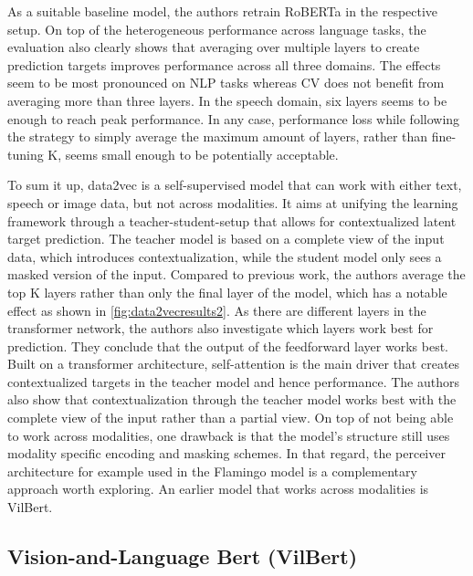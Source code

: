 \documentclass[
]{krantz}
\begin{document}
As a suitable baseline model, the authors retrain RoBERTa in the respective setup. On top of the heterogeneous performance across language tasks, the evaluation also clearly shows that averaging over multiple layers to create prediction targets improves performance across all three domains. The effects seem to be most pronounced on NLP tasks whereas CV does not benefit from averaging more than three layers. In the speech domain, six layers seems to be enough to reach peak performance. In any case, performance loss while following the strategy to simply average the maximum amount of layers, rather than fine-tuning K, seems small enough to be potentially acceptable.

To sum it up, data2vec is a self-supervised model that can work with either text, speech or image data, but not across modalities. It aims at unifying the learning framework through a teacher-student-setup that allows for contextualized latent target prediction. The teacher model is based on a complete view of the input data, which introduces contextualization, while the student model only sees a masked version of the input. Compared to previous work, the authors average the top K layers rather than only the final layer of the model, which has a notable effect as shown in \ref{fig:data2vecresults2}. As there are different layers in the transformer network, the authors also investigate which layers work best for prediction. They conclude that the output of the feedforward layer works best. Built on a transformer architecture, self-attention is the main driver that creates contextualized targets in the teacher model and hence performance. The authors also show that contextualization through the teacher model works best with the complete view of the input rather than a partial view. On top of not being able to work across modalities, one drawback is that the model's structure still uses modality specific encoding and masking schemes. In that regard, the perceiver architecture \citep{jaegle2021perceiver} for example used in the Flamingo model is a complementary approach worth exploring. An earlier model that works across modalities is VilBert.

\hypertarget{vision-and-language-bert-vilbert}{%
\subsection{Vision-and-Language Bert (VilBert)}\label{vision-and-language-bert-vilbert}}
\end{document}
